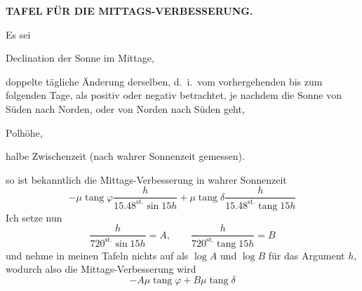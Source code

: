 \newsavebox{\GaussVIMittagsFrameBox}
\newenvironment{GaussVIMittagsFrame}{%
  \par\noindent
  \begin{lrbox}{\GaussVIMittagsFrameBox}%
  \begin{minipage}{\dimexpr\linewidth-20pt\relax}%
  \centering
  \vspace*{9pt}%
  {\large\itshape Tafel für die Mittags-Verbesserung.\par}
  \smallskip
  {\large Argument: Halbe Zwischenzeit.\par}
  \smallskip
}{%
  \par\vspace*{17pt}%
  \end{minipage}%
  \end{lrbox}%
  {\setlength{\fboxrule}{1.8pt}\setlength{\fboxsep}{1.2pt}%
  \makebox[\linewidth][c]{\fbox{%
    \setlength{\fboxrule}{.4pt}\setlength{\fboxsep}{6pt}%
    \fbox{\usebox{\GaussVIMittagsFrameBox}}}}}%
  \par
}
\thispagestyle{empty}
\noindent{}%
\makebox[12mm][l]{}%
\parbox[t]{\dimexpr\linewidth-24mm\relax}{\centering\footnotesize\bfseries TAFEL FÜR DIE MITTAGS-VERBESSERUNG.\par}%
\par\nobreak\medskip
\indent Es sei
\begin{list}{}{\setlength{\leftmargin}{1.8em}\setlength{\labelwidth}{1.2em}\setlength{\labelsep}{.6em}\setlength{\itemsep}{0pt}\setlength{\parsep}{0pt}}
\item[$\delta$] Declination der Sonne im Mittage,
\item[$\mu$] doppelte tägliche Änderung derselben, d.\ i.\ vom vorhergehenden bis zum folgenden Tage, als positiv oder negativ betrachtet, je nachdem die Sonne von Süden nach Norden, oder von Norden nach Süden geht,
\item[$\varphi$] Polhöhe,
\item[$h$] halbe Zwischenzeit (nach wahrer Sonnenzeit gemessen).
\end{list}
so ist bekanntlich die Mittags-Verbesserung in wahrer Sonnenzeit
\[
-\mu\operatorname{tang}\varphi\frac h{15.48^{\mathrm{st.}}\sin15h}+\mu\operatorname{tang}\delta\frac h{15.48^{\mathrm{st.}}\operatorname{tang}15h}
\]
Ich setze nun
\[
\frac h{720^{\mathrm{st.}}\sin15h}=A,\qquad\frac h{720^{\mathrm{st.}}\operatorname{tang}15h}=B
\]
und nehme in meinen Tafeln nichts auf als $\log A$ und $\log B$ für das Argument $h$, wodurch also die Mittags-Verbesserung wird
\[
-A\mu\operatorname{tang}\varphi+B\mu\operatorname{tang}\delta
\]

